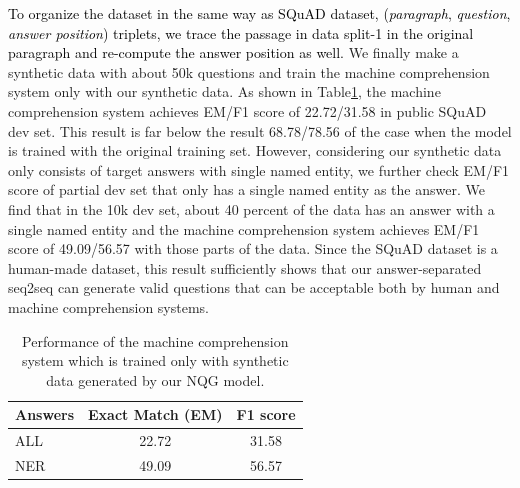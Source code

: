 \documentclass[letterpaper]{article} %
\newcommand\Tstrut{\rule{0pt}{2.3ex}}         %
\newcommand{\hh}[1]{\textcolor{black}{#1}}
\begin{document}
\hh{To organize the dataset in the same way as SQuAD dataset, (\textit{paragraph}, \textit{question}, \textit{answer position}) triplets, we trace the passage in data split-1 in the original paragraph and re-compute the answer position as well.} We finally make a synthetic data with about 50k questions and train the machine comprehension system only with our synthetic data.
% 
% 
% 
% 
% 
As shown in Table\ref{table:qa}, the machine comprehension system achieves EM/F1 score of 22.72/31.58 in public SQuAD dev set. This result is far below the result 68.78/78.56 of the case when the model is trained with the original training set. However, considering our synthetic data only consists of target answers with single named entity, we further check EM/F1 score of partial dev set that only has a single named entity as the answer. We find that in the 10k dev set, about 40 percent of the data has an answer with a single named entity and the machine comprehension system achieves EM/F1 score of 49.09/56.57 with those parts of the data. Since the SQuAD dataset is a human-made dataset, this result sufficiently shows that our answer-separated seq2seq can generate valid questions that can be acceptable both by human and machine comprehension systems.
% 
% 
% 
% 


\begin{table}[!t]
\centering
\begin{tabular}{|l|c|c|}
\hline
Answers & Exact Match (EM)      & F1 score\Tstrut      \\ \hline
ALL     & 22.72       & 31.58\Tstrut       \\ \hline
NER     & 49.09 & 56.57\Tstrut \\ \hline
\end{tabular}%
\caption{Performance of the machine comprehension system which is trained only with synthetic data generated by our NQG model.}
\label{table:qa}
\end{table}
\end{document}
